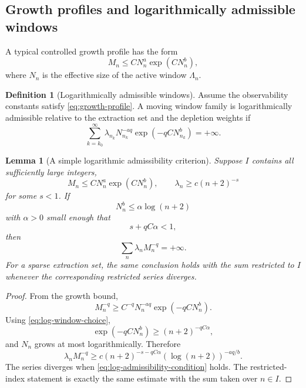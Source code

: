 \documentclass[11pt]{article}
\numberwithin{equation}{section}
\theoremstyle{plain}
\newtheorem{lemma}[theorem]{Lemma}
\theoremstyle{definition}
\newtheorem{definition}[theorem]{Definition}
\theoremstyle{remark}
\begin{document}
\subsection{Growth profiles and logarithmically admissible windows}

A typical controlled growth profile has the form
\begin{equation}
        M_n\le C N_n^a\exp(CN_n^b),
        \label{eq:growth-profile}
\end{equation}
where \(N_n\) is the effective size of the active window \(\Lambda_n\).

\begin{definition}[Logarithmically admissible windows]
\label{def:log-admissible-windows}
Assume the observability constants satisfy \eqref{eq:growth-profile}.  A moving
window family is logarithmically admissible relative to the extraction set and
the depletion weights if
\begin{equation}
        \sum_{k=k_0}^{\infty}
        \lambda_{n_k}N_{n_k}^{-aq}\exp(-qC N_{n_k}^b)
        =+
        \infty.
        \label{eq:log-admissible}
\end{equation}
\end{definition}

\begin{lemma}[A simple logarithmic admissibility criterion]
\label{lem:log-admissibility-criterion}
Suppose \(I\) contains all sufficiently large integers,
\[
        M_n\le C N_n^a\exp(CN_n^b),
        \qquad
        \lambda_n\ge c(n+2)^{-s}
\]
for some \(s<1\).  If
\begin{equation}
        N_n^b\le \alpha\log(n+2)
        \label{eq:log-window-choice}
\end{equation}
with \(\alpha>0\) small enough that
\begin{equation}
        s+qC\alpha<1,
        \label{eq:log-admissibility-condition}
\end{equation}
then
\[
        \sum_n\lambda_nM_n^{-q}=+\infty.
\]
For a sparse extraction set, the same conclusion holds with the sum restricted
to \(I\) whenever the corresponding restricted series diverges.
\end{lemma}

\begin{proof}
From the growth bound,
\[
        M_n^{-q}\ge C^{-q}N_n^{-aq}\exp(-qC N_n^b).
\]
Using \eqref{eq:log-window-choice},
\[
        \exp(-qC N_n^b)\ge(n+2)^{-qC\alpha},
\]
and \(N_n\) grows at most logarithmically.  Therefore
\[
        \lambda_nM_n^{-q}
        \ge
        c(n+2)^{-s-qC\alpha}(\log(n+2))^{-aq/b}.
\]
The series diverges when \eqref{eq:log-admissibility-condition} holds.  The
restricted-index statement is exactly the same estimate with the sum taken over
\(n\in I\).
\end{proof}
\end{document}
